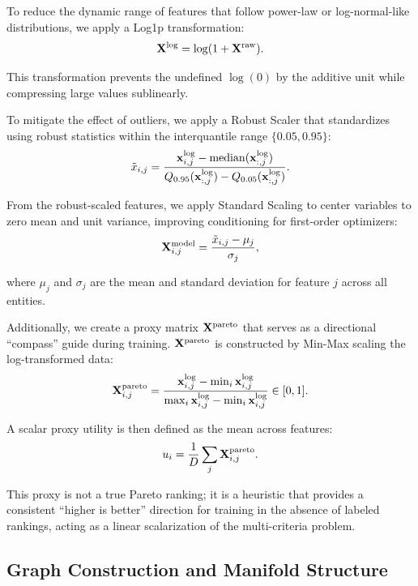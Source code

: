 \documentclass[english]{sbrt}
\begin{document}
To reduce the dynamic range of features that follow power-law or log-normal-like distributions, we apply a Log1p transformation:
\begin{equation}
    \mathbf{X}^\mathrm{log} = \log(1+\mathbf{X}^\mathrm{raw}).
    \label{eq:log1p}
\end{equation}

\noindent
This transformation prevents the undefined $\log(0)$ by the additive unit while compressing large values sublinearly.

To mitigate the effect of outliers, we apply a Robust Scaler that standardizes using robust statistics within the interquantile range $\{0.05, 0.95\}$:
\begin{equation}
    \tilde{x}_{i,j} =
        \frac{\mathbf{x}^\mathrm{log}_{i,j} - \mathrm{median}(\mathbf{x}^\mathrm{log}_{:,j})}
        {Q_{0.95}(\mathbf{x}^\mathrm{log}_{:,j})-Q_{0.05}(\mathbf{x}^\mathrm{log}_{:,j})}.
    \label{eq:robust_scaling}
\end{equation}

From the robust-scaled features, we apply Standard Scaling to center variables to zero mean and unit variance, improving conditioning for first-order optimizers:
\begin{equation}
    \mathbf{X}^\mathrm{model}_{i,j} = \frac{\tilde{x}_{i,j} - \mu_j}{\sigma_j},
    \label{eq:std_scaling}
\end{equation}

\noindent
where $\mu_j$ and $\sigma_j$ are the mean and standard deviation for feature $j$ across all entities.

Additionally, we create a proxy matrix $\mathbf{X}^\mathrm{pareto}$ that serves as a directional ``compass'' guide during training. $\mathbf{X}^\mathrm{pareto}$ is constructed by Min-Max scaling the log-transformed data:
\begin{equation}
    \mathbf{X}^\mathrm{pareto}_{i,j} = 
        \frac{\mathbf{x}^\mathrm{log}_{i,j} - \min_i \mathbf{x}^\mathrm{log}_{i,j}}
        {\max_i \mathbf{x}^\mathrm{log}_{i,j} - \min_i \mathbf{x}^\mathrm{log}_{i,j}} 
        \in [0,1].
    \label{eq:pareto}
\end{equation}

A scalar proxy utility is then defined as the mean across features:
\begin{equation}
    u_i = \frac{1}{D} \sum_j \mathbf{X}^\mathrm{pareto}_{i,j}.
\end{equation}

\noindent
This proxy is not a true Pareto ranking; it is a heuristic that provides a consistent ``higher is better'' direction for training in the absence of labeled rankings, acting as a linear scalarization of the multi-criteria problem.


\subsection{Graph Construction and Manifold Structure}
\end{document}
